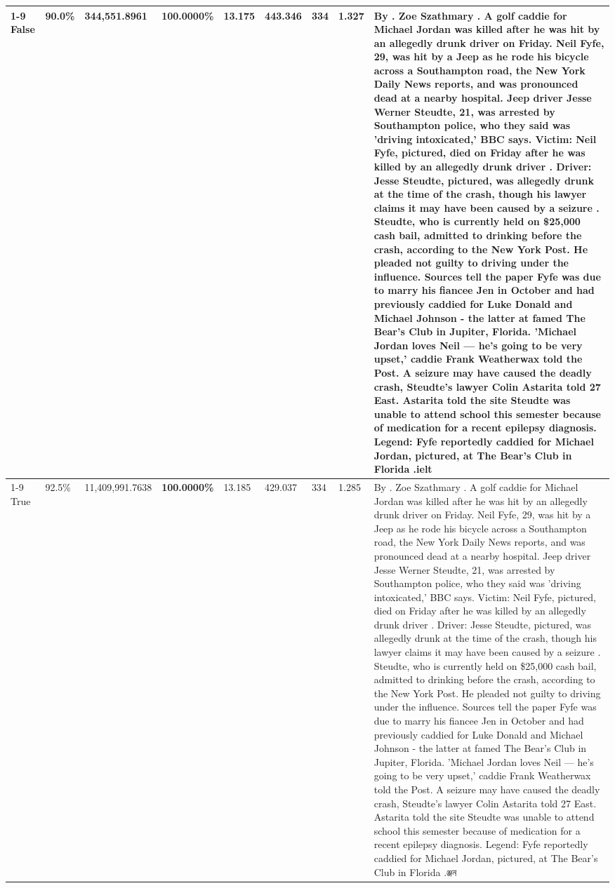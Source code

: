 \begin{table}[H]
\begin{tabular}{lllrlllll}
\cline{1-9}
False & 90.0\% & 344,551.8961 & \bfseries \color{red} 100.0000\% & 13.175 & 443.346 & 334 & 1.327 & By . Zoe Szathmary . A golf caddie for Michael Jordan was killed after he was hit by an allegedly drunk driver on Friday. Neil Fyfe, 29, was hit by a Jeep as he rode his bicycle across a Southampton road, the New York Daily News reports, and was pronounced dead at a nearby hospital. Jeep driver Jesse Werner Steudte, 21, was arrested by Southampton police, who they said was 'driving intoxicated,' BBC says. Victim: Neil Fyfe, pictured, died on Friday after he was killed by an allegedly drunk driver . Driver: Jesse Steudte, pictured, was allegedly drunk at the time of the crash, though his lawyer claims it may have been caused by a seizure . Steudte, who is currently held on \$25,000 cash bail, admitted to drinking before the crash, according to the New York Post. He pleaded not guilty to driving under the influence. Sources tell the paper Fyfe was due to marry his fiancee Jen in October and had previously caddied for Luke Donald and Michael Johnson - the latter at famed The Bear's Club in Jupiter, Florida. 'Michael Jordan loves Neil — he’s going to be very upset,' caddie Frank Weatherwax told the Post. A seizure may have caused the deadly crash, Steudte's lawyer Colin Astarita told 27 East. Astarita told the site Steudte was unable to attend school this semester because of medication for a recent epilepsy diagnosis. Legend: Fyfe reportedly caddied for Michael Jordan, pictured, at The Bear's Club in Florida .ielt \\
\cline{1-9}
True & 92.5\% & 11,409,991.7638 & \bfseries \color{red} 100.0000\% & 13.185 & 429.037 & 334 & 1.285 & By . Zoe Szathmary . A golf caddie for Michael Jordan was killed after he was hit by an allegedly drunk driver on Friday. Neil Fyfe, 29, was hit by a Jeep as he rode his bicycle across a Southampton road, the New York Daily News reports, and was pronounced dead at a nearby hospital. Jeep driver Jesse Werner Steudte, 21, was arrested by Southampton police, who they said was 'driving intoxicated,' BBC says. Victim: Neil Fyfe, pictured, died on Friday after he was killed by an allegedly drunk driver . Driver: Jesse Steudte, pictured, was allegedly drunk at the time of the crash, though his lawyer claims it may have been caused by a seizure . Steudte, who is currently held on \$25,000 cash bail, admitted to drinking before the crash, according to the New York Post. He pleaded not guilty to driving under the influence. Sources tell the paper Fyfe was due to marry his fiancee Jen in October and had previously caddied for Luke Donald and Michael Johnson - the latter at famed The Bear's Club in Jupiter, Florida. 'Michael Jordan loves Neil — he’s going to be very upset,' caddie Frank Weatherwax told the Post. A seizure may have caused the deadly crash, Steudte's lawyer Colin Astarita told 27 East. Astarita told the site Steudte was unable to attend school this semester because of medication for a recent epilepsy diagnosis. Legend: Fyfe reportedly caddied for Michael Jordan, pictured, at The Bear's Club in Florida .ঞ্জন \\

\end{tabular}
\end{table}
